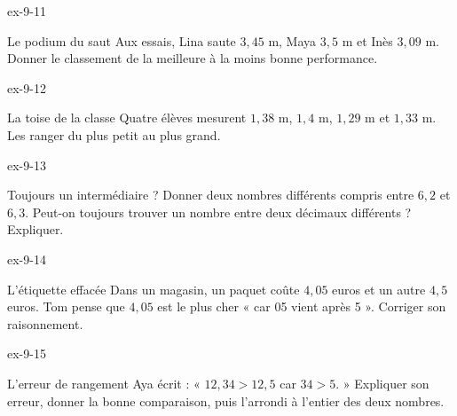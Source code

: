 \begin{blocLivre}{ex-9-11}\begin{exercice}[3]{Le podium du saut}
Aux essais, Lina saute $3{,}45$ m, Maya $3{,}5$ m et Inès $3{,}09$ m. Donner le classement de la meilleure à la moins bonne performance.
\end{exercice}\end{blocLivre}
\begin{blocLivre}{ex-9-12}\begin{exercice}[3]{La toise de la classe}
Quatre élèves mesurent $1{,}38$ m, $1{,}4$ m, $1{,}29$ m et $1{,}33$ m. Les ranger du plus petit au plus grand.
\end{exercice}\end{blocLivre}
\begin{blocLivre}{ex-9-13}\begin{exercice}[3]{Toujours un intermédiaire ?}
Donner deux nombres différents compris entre $6{,}2$ et $6{,}3$. Peut-on toujours trouver un nombre entre deux décimaux différents ? Expliquer.
\end{exercice}\end{blocLivre}
\begin{blocLivre}{ex-9-14}\begin{exercice}[3]{L’étiquette effacée}
Dans un magasin, un paquet coûte $4{,}05$ euros et un autre $4{,}5$ euros. Tom pense que $4{,}05$ est le plus cher « car 05 vient après 5 ». Corriger son raisonnement.
\end{exercice}\end{blocLivre}
\begin{blocLivre}{ex-9-15}\begin{exercice}[3]{L’erreur de rangement}
Aya écrit : « $12{,}34>12{,}5$ car $34>5$. » Expliquer son erreur, donner la bonne comparaison, puis l’arrondi à l’entier des deux nombres.
\end{exercice}\end{blocLivre}

\clearpage
